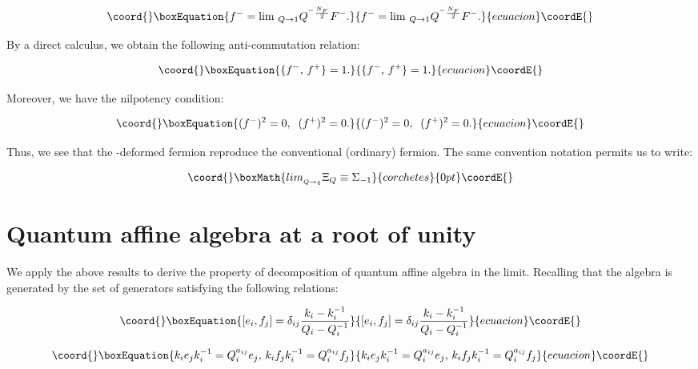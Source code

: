 \documentclass[a4paper,12pt,thmsa]{article}
\begin{document}
\begin{equation}\coord{}\boxEquation{
f^{-}=\lim \, _{Q\rightarrow 1}Q^{^{-}\frac{N_F}2}F^{-}.
}{
f^{-}=\lim \, _{Q\rightarrow 1}Q^{^{-}\frac{N_F}2}F^{-}.
}{ecuacion}\coordE{}\end{equation}

By a direct calculus, we obtain the following anti-commutation relation:

\begin{equation}\coord{}\boxEquation{
\{f^{-},\, f^{+}\}=1.
}{
\{f^{-},\, f^{+}\}=1.
}{ecuacion}\coordE{}\end{equation}

Moreover, we have the nilpotency condition:

\begin{equation}\coord{}\boxEquation{
(f^{-})^2=0, \;\;(f^{+})^2=0.
}{
(f^{-})^2=0, \;\;(f^{+})^2=0.
}{ecuacion}\coordE{}\end{equation}

Thus, we see that the \coordHE{}-deformed fermion reproduce the conventional
(ordinary) fermion. The same convention notation permits us to write:

\[\coord{}\boxMath{
lim_{_{Q\rightarrow q}}\Xi _Q\equiv \Sigma _{-1}
}{corchetes}{0pt}\coordE{}\]

\section{Quantum affine algebra \coordHE{} at \coordHE{} a root of unity}

We apply the above results to derive the property of decomposition of
quantum affine algebra \coordHE{} in the \coordHE{} limit.
Recalling that the \coordHE{} algebra is generated by the set of
generators \coordHE{}  \coordHE{}  \coordHE{}  \coordHE{}  \myHighlight{$\langle $}\coordHE{}  \coordHE{} satisfying the following relations:

\begin{equation}\coord{}\boxEquation{
\lbrack e_i,f_j]=\delta _{ij}\frac{k_i-k_i^{-1}}{Q_i-Q_i^{-1}}
}{
\lbrack e_i,f_j]=\delta _{ij}\frac{k_i-k_i^{-1}}{Q_i-Q_i^{-1}}
}{ecuacion}\coordE{}\end{equation}

\begin{equation}\coord{}\boxEquation{
k_{i}e_{j}k_{i}^{-1}=Q_{i}^{a_{ij}}e_{j},\, 
k_{i}f_{j}k_{i}^{-1}=Q_{i}^{a_{ij}}f_{j}
}{
k_{i}e_{j}k_{i}^{-1}=Q_{i}^{a_{ij}}e_{j},\, 
k_{i}f_{j}k_{i}^{-1}=Q_{i}^{a_{ij}}f_{j}
}{ecuacion}\coordE{}\end{equation}
\end{document}
